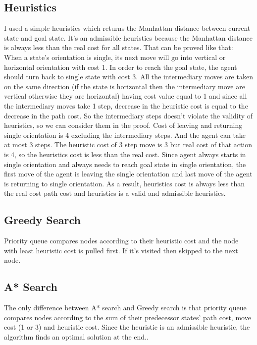 \documentclass[12pt]{article}
\begin{document}
\subsection{Heuristics}
I used a simple heuristics which returns the Manhattan distance between current state and goal state. It's an admissible heuristics because the Manhattan distance is always less than the real cost for all states. That can be proved like that:\\
When a state's orientation is single, its next move will go into vertical or horizontal orientation with cost 1. In order to reach the goal state, the agent should turn back to single state with cost 3. All the intermediary moves are taken on the same direction (if the state is horizontal then the intermediary move are vertical otherwise they are horizontal) having cost value equal to 1 and since all the intermediary moves take 1 step, decrease in the heuristic cost is equal to the decrease in the path cost. So the intermediary steps doesn't violate the validity of heuristics, so we can consider them in the proof. Cost of leaving and returning single orientation is 4 excluding the intermediary steps. And the agent can take at most 3 steps. The heuristic cost of 3 step move is 3 but real cost of that action is 4, so the heuristics cost is less than the real cost. Since agent always starts in single orientation and always needs to reach goal state in single orientation, the first move of the agent is leaving the single orientation and last move of the agent is returning to single orientation. As a result, heuristics cost is always less than the real cost path cost and heuristics is a valid and admissible heuristics.

\subsection{Greedy Search}
Priority queue compares nodes according to their heuristic cost and the node with least heuristic cost is pulled first. If it's visited then skipped to the next node.
\subsection{A* Search}
The only difference between A* search and Greedy search is that priority queue compares nodes according to the sum of their predecessor states' path cost, move cost (1 or 3) and heuristic cost. Since the heuristic is an admissible heuristic, the algorithm finds an optimal solution at the end..
\end{document}
